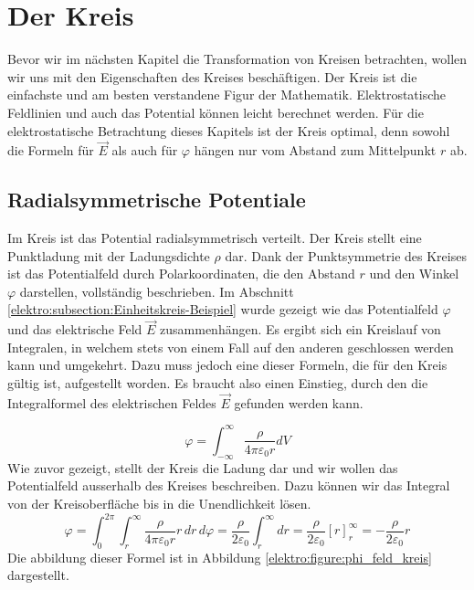 %
%
%
%
\section{Der Kreis
\label{elektro:section:DerKreis}}
Bevor wir im nächsten Kapitel die Transformation von Kreisen betrachten, wollen wir uns mit den Eigenschaften des Kreises beschäftigen.
Der Kreis ist die einfachste und am besten verstandene Figur der Mathematik.
Elektrostatische Feldlinien und auch das Potential können leicht berechnet werden.
Für die elektrostatische Betrachtung dieses Kapitels ist der Kreis optimal, denn sowohl die Formeln für $\vec{E}$ als auch für $\varphi$ hängen nur vom Abstand zum Mittelpunkt $r$ ab.


\subsection{Radialsymmetrische Potentiale
\label{elektro:subsection:RadialsymmetrischePotentiale}}
Im Kreis ist das Potential radialsymmetrisch verteilt.
Der Kreis stellt eine Punktladung mit der Ladungsdichte $\rho$ dar.
Dank der Punktsymmetrie des Kreises ist das Potentialfeld durch Polarkoordinaten, die den Abstand $r$ und den Winkel $\varphi$ darstellen, vollständig beschrieben.  
Im Abschnitt \ref{elektro:subsection:Einheitskreis-Beispiel} wurde gezeigt wie das Potentialfeld $\varphi$ und das elektrische Feld $\vec{E}$ zusammenhängen.
Es ergibt sich ein Kreislauf von Integralen, in welchem stets von einem Fall auf den anderen geschlossen werden kann und umgekehrt.
Dazu muss jedoch eine dieser Formeln, die für den Kreis gültig ist, aufgestellt worden.
Es braucht also einen Einstieg, durch den die Integralformel des elektrischen Feldes $\vec{E}$ gefunden werden kann. 

\begin{equation}
    \varphi = \int_{-\infty}^{\infty} \frac{\rho}{4\pi\varepsilon_0 r} dV
    \label{elektro:equation:potentialbegin}
\end{equation}
Wie zuvor gezeigt, stellt der Kreis die Ladung dar und wir wollen das Potentialfeld ausserhalb des Kreises beschreiben.
Dazu können wir das Integral von der Kreisoberfläche bis in die Unendlichkeit lösen.
\begin{equation}
    \varphi = \int_{0}^{2\pi} \int_{r}^{\infty} \frac{\rho}{4\pi\varepsilon_0 r} r \, dr \, d\varphi
    = \frac{\rho}{2\varepsilon_0} \int_{r}^{\infty} dr
    = \frac{\rho}{2\varepsilon_0} [r]_{r}^{\infty}
    = -\frac{\rho}{2\varepsilon_0} r
\end{equation}
Die abbildung dieser Formel ist in Abbildung \ref{elektro:figure:phi_feld_kreis} dargestellt.

